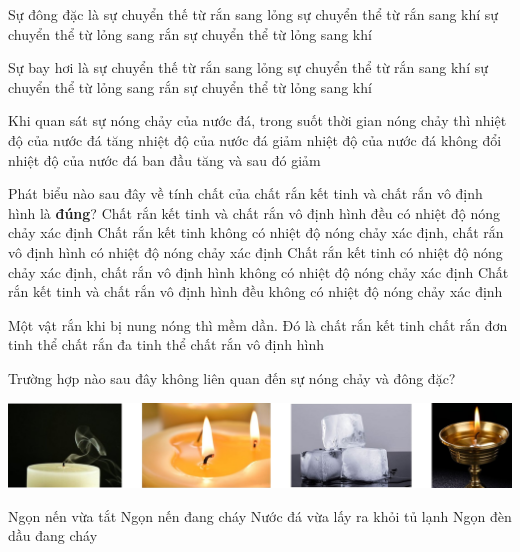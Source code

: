 \begin{ex}
Sự đông đặc là
\choice
{ sự chuyển thế từ rắn sang lỏng}
{ sự chuyển thể từ rắn sang khí}
{\True sự chuyển thể từ lỏng sang rắn}
{ sự chuyển thể từ lỏng sang khí}
\loigiai{ }
\end{ex}
\begin{ex}
Sự bay hơi là
\choice
{ sự chuyển thế từ rắn sang lỏng}
{ sự chuyển thể từ rắn sang khí}
{ sự chuyển thể từ lỏng sang rắn}
{\True sự chuyển thể từ lỏng sang khí}
\loigiai{ }
\end{ex}
\begin{ex}
Khi quan sát sự nóng chảy của nước đá, trong suốt thời gian nóng chảy thì
\choice
{ nhiệt độ của nước đá tăng}
{ nhiệt độ của nước đá giảm}
{\True nhiệt  độ của nước đá không đổi}
{ nhiệt độ của nước đá ban đầu tăng và sau đó giảm}
\loigiai{ }
\end{ex}
\begin{ex}
Phát biểu nào sau đây về tính chất của chất rắn kết tinh và chất rắn vô định hình là \textbf{đúng}?
\choice
{ Chất rắn kết tinh và chất rắn vô định hình đều có nhiệt độ nóng chảy xác định}
{ Chất rắn kết tinh không có nhiệt độ nóng chảy xác định, chất rắn vô định hình có nhiệt độ nóng chảy xác định}
{\True Chất rắn kết tinh có nhiệt độ nóng chảy xác định, chất rắn vô định hình không có nhiệt độ nóng chảy xác định}
{ Chất rắn kết tinh và chất rắn vô định hình đều không có nhiệt độ nóng chảy xác định}
\loigiai{ }
\end{ex}
\begin{ex}
Một vật rắn khi bị nung nóng thì mềm dần. Đó là
\choice
{ chất rắn kết tinh}
{ chất rắn đơn tinh thể}
{ chất rắn đa tinh thể}
{\True chất rắn vô định hình}
\loigiai{ }
\end{ex}
\begin{ex}
Trường hợp nào sau đây không liên quan đến sự nóng chảy và đông đặc?
	\begin{center}
		\includegraphics[width=0.45\linewidth]{figs/VN12-Y24-PH-SYL-001P-2}
	\end{center}
\choice
{ Ngọn nến vừa tắt}
{ Ngọn nến đang cháy}
{ Nước đá vừa lấy ra khỏi tủ lạnh}
{\True Ngọn đèn dầu đang cháy}
\loigiai{ }
\end{ex}

